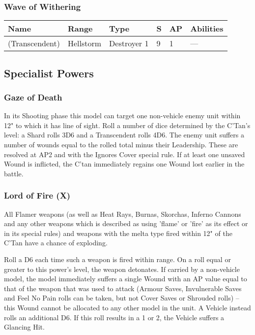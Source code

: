 \subsubsection{Wave of Withering} \label{Wave of Withering}

\noindent
\begin{tabular}{||m{160pt} m{31pt} m{55pt} m{12pt} m{12pt} m{200pt}||}
	\hline
	Name & Range & Type & S & AP & Abilities \\
	\hline
	\quickref{Wave of Withering} (Transcendent) & Hellstorm & Destroyer 1 & 9 & 1 & — \\
	\hline
\end{tabular}

\subsection{Specialist Powers}

\subsubsection{Gaze of Death} \label{Gaze of Death}

In its Shooting phase this model can target one non-vehicle enemy unit within 12" to which it has line of sight. Roll a number of dice determined by the C'Tan's level: a Shard rolls 3D6 and a Transcendent rolls 4D6. The enemy unit suffers a number of wounds equal to the rolled total minus their Leadership. These are resolved at AP2 and with the Ignores Cover special rule. If at least one unsaved Wound is inflicted, the C’tan immediately regains one Wound lost earlier in the battle.

\subsubsection{Lord of Fire (X)} \label{Lord of Fire}

All Flamer weapons (as well as Heat Rays, Burnas, Skorchas, Inferno Cannons and any other weapons which is described as using 'flame' or 'fire' as its effect or in its special rules) and weapons with the melta type fired within 12" of the C'Tan have a chance of exploding. 

Roll a D6 each time such a weapon is fired within range. On a roll equal or greater to this power's level, the weapon detonates. If carried by a non-vehicle model, the model immediately suffers a single Wound with an AP value equal to that of the weapon that was used to attack (Armour Saves, Invulnerable Saves and Feel No Pain rolls can be taken, but not Cover Saves or Shrouded rolls) – this Wound cannot be allocated to any other model in the unit. A Vehicle instead rolls an additional D6. If this roll results in a 1 or 2, the Vehicle suffers a Glancing Hit.

